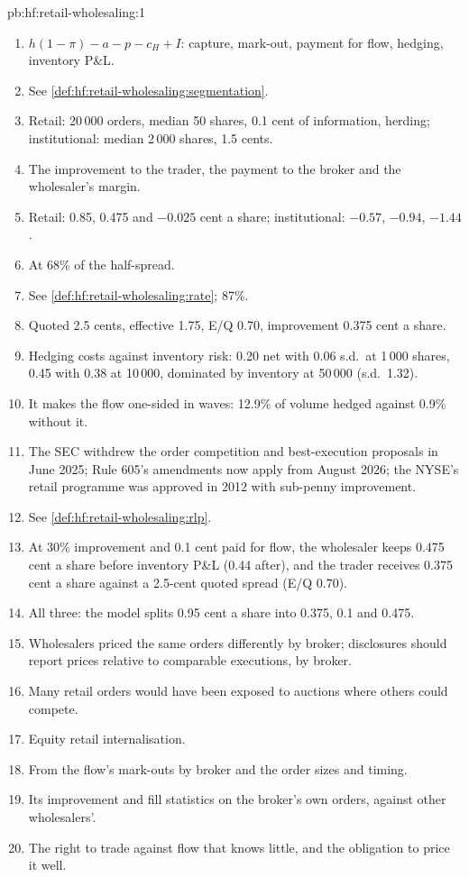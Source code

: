 \begin{solution}{pb:hf:retail-wholesaling:1}
\begin{enumerate}
\item $h(1-\pi)-a-p-c_H+I$: capture, mark-out, payment for flow, hedging, inventory P\&L.
\item See \cref{def:hf:retail-wholesaling:segmentation}.
\item Retail: 20\,000 orders, median 50 shares, 0.1 cent of information, herding; institutional: median 2\,000 shares, 1.5 cents.
\item The improvement to the trader, the payment to the broker and the wholesaler's margin.
\item Retail: 0.85, 0.475 and $-0.025$ cent a share; institutional: $-0.57$, $-0.94$, $-1.44$.
\item At 68\% of the half-spread.
\item See \cref{def:hf:retail-wholesaling:rate}; 87\%.
\item Quoted 2.5 cents, effective 1.75, E/Q 0.70, improvement 0.375 cent a share.
\item Hedging costs against inventory risk: 0.20 net with 0.06 s.d.\ at 1\,000 shares, 0.45 with 0.38 at 10\,000, dominated by inventory at 50\,000
(s.d.\ 1.32).
\item It makes the flow one-sided in waves: 12.9\% of volume hedged against 0.9\% without it.
\item The SEC withdrew the order competition and best-execution proposals in June 2025; Rule 605's amendments now apply from August 2026; the NYSE's
retail programme was approved in 2012 with sub-penny improvement.
\item See \cref{def:hf:retail-wholesaling:rlp}.
\item At 30\% improvement and 0.1 cent paid for flow, the wholesaler keeps 0.475 cent a share before inventory P\&L (0.44 after), and the trader
receives 0.375 cent a share against a 2.5-cent quoted spread (E/Q 0.70).
\item All three: the model splits 0.95 cent a share into 0.375, 0.1 and 0.475.
\item Wholesalers priced the same orders differently by broker; disclosures should report prices relative to comparable executions, by broker.
\item Many retail orders would have been exposed to auctions where others could compete.
\item Equity retail internalisation.
\item From the flow's mark-outs by broker and the order sizes and timing.
\item Its improvement and fill statistics on the broker's own orders, against other wholesalers'.
\item The right to trade against flow that knows little, and the obligation to price it well.
\end{enumerate}
\end{solution}

